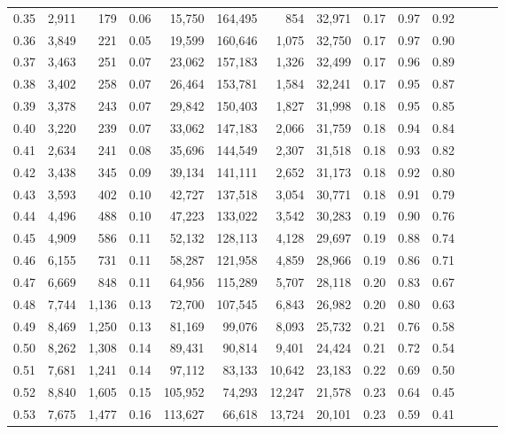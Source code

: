 \begin{tabular}{rrrrrrrrrrrrrr}
0.35 &  2,911 &    179 &  0.06 &   15,750 &  164,495 &     854 &  32,971 &  0.17 &  0.97 &      0.92 \\
0.36 &  3,849 &    221 &  0.05 &   19,599 &  160,646 &   1,075 &  32,750 &  0.17 &  0.97 &      0.90 \\
0.37 &  3,463 &    251 &  0.07 &   23,062 &  157,183 &   1,326 &  32,499 &  0.17 &  0.96 &      0.89 \\
0.38 &  3,402 &    258 &  0.07 &   26,464 &  153,781 &   1,584 &  32,241 &  0.17 &  0.95 &      0.87 \\
0.39 &  3,378 &    243 &  0.07 &   29,842 &  150,403 &   1,827 &  31,998 &  0.18 &  0.95 &      0.85 \\
0.40 &  3,220 &    239 &  0.07 &   33,062 &  147,183 &   2,066 &  31,759 &  0.18 &  0.94 &      0.84 \\
0.41 &  2,634 &    241 &  0.08 &   35,696 &  144,549 &   2,307 &  31,518 &  0.18 &  0.93 &      0.82 \\
0.42 &  3,438 &    345 &  0.09 &   39,134 &  141,111 &   2,652 &  31,173 &  0.18 &  0.92 &      0.80 \\
0.43 &  3,593 &    402 &  0.10 &   42,727 &  137,518 &   3,054 &  30,771 &  0.18 &  0.91 &      0.79 \\
0.44 &  4,496 &    488 &  0.10 &   47,223 &  133,022 &   3,542 &  30,283 &  0.19 &  0.90 &      0.76 \\
0.45 &  4,909 &    586 &  0.11 &   52,132 &  128,113 &   4,128 &  29,697 &  0.19 &  0.88 &      0.74 \\
0.46 &  6,155 &    731 &  0.11 &   58,287 &  121,958 &   4,859 &  28,966 &  0.19 &  0.86 &      0.71 \\
0.47 &  6,669 &    848 &  0.11 &   64,956 &  115,289 &   5,707 &  28,118 &  0.20 &  0.83 &      0.67 \\
0.48 &  7,744 &  1,136 &  0.13 &   72,700 &  107,545 &   6,843 &  26,982 &  0.20 &  0.80 &      0.63 \\
0.49 &  8,469 &  1,250 &  0.13 &   81,169 &   99,076 &   8,093 &  25,732 &  0.21 &  0.76 &      0.58 \\
0.50 &  8,262 &  1,308 &  0.14 &   89,431 &   90,814 &   9,401 &  24,424 &  0.21 &  0.72 &      0.54 \\
0.51 &  7,681 &  1,241 &  0.14 &   97,112 &   83,133 &  10,642 &  23,183 &  0.22 &  0.69 &      0.50 \\
0.52 &  8,840 &  1,605 &  0.15 &  105,952 &   74,293 &  12,247 &  21,578 &  0.23 &  0.64 &      0.45 \\
0.53 &  7,675 &  1,477 &  0.16 &  113,627 &   66,618 &  13,724 &  20,101 &  0.23 &  0.59 &      0.41 \\

\end{tabular}

